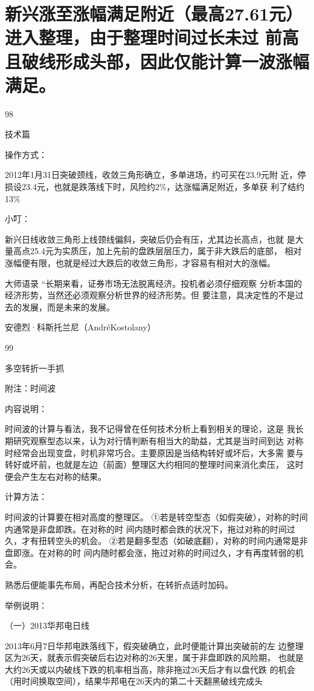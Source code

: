 \documentclass{article}
\begin{document}
\section{新兴涨至涨幅满足附近（最高27.61元）进入整理，由于整理时间过长未过 前高且破线形成头部，因此仅能计算一波涨幅满足。}

98

\clearpage

技术篇

操作方式：

2012年1月31日突破颈线，收敛三角形确立，多单进场，约可买在23.9元附 近，停损设23.4元，也就是跌落线下时，风险约2\%，达涨幅满足附近，多单获 利了结约13\%

小叮：

新兴日线收敛三角形上线颈线偏斜，突破后仍会有压，尤其边长高点，也就 是大量高点25.4元为实质压，加上先前的盘跌层层压力，属于非大跌后的底部， 相对涨幅便有限，也就是经过大跌后的收敛三角形，才容易有相对大的涨幅。

大师语录 “长期来看，证券市场无法脱离经济。投机者必须仔细观察 分析本国的经济形势，当然还必须观察分析世界的经济形势。但 要注意，具决定性的不是过去的发展，而是未来的发展。

安德烈·科斯托兰尼（AndréKostolany）

99

\clearpage

多空转折一手抓

附注：时间波

内容说明：

时间波的计算与看法，我不记得曾在任何技术分析上看到相关的理论，这是 我长期研究观察型态以来，认为对行情判断有相当大的助益，尤其是当时间到达 对称时经常会出现变盘，时机非常巧合。主要原因是当结构转好或坏后，大多需 要与转好或坏前，也就是左边（前面）整理区大约相同的整理时间来消化卖压， 这时便会产生左右对称的结果。

计算方法：

时间波的计算要在相对高度的整理区。 ①若是转空型态（如假突破），对称的时间内通常是非盘即跌。在对称的时 间内随时都会跌的状况下，拖过对称的时间过久，才有扭转空头的机会。 ②若是翻多型态（如破底翻），对称的时间内通常是非盘即涨。在对称的时 间内随时都会涨，拖过对称的时间过久，才有再度转弱的机会。

熟悉后便能事先布局，再配合技术分析，在转折点适时加码。

举例说明：

（一）2013华邦电日线

2013年6月7日华邦电跌落线下，假突破确立，此时便能计算出突破前的左 边整理区为26天，就表示假突破后右边对称的26天里，属于非盘即跌的风险期， 也就是大约26天或以内破线下跌的机率相当高，除非拖过26天后才有以盘代跌 的机会（用时间换取空间），结果华邦电在26天内的第二十天翻黑破线完成头
\end{document}
